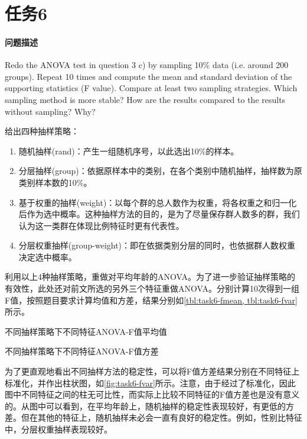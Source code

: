 \documentclass[a4paper,12pt]{article}
\begin{document}
    \section{任务6} %
    \paragraph{问题描述} Redo the ANOVA test in question 3 c) by sampling 10\% data (i.e. around 200 groups). Repeat 10 times and compute the mean and standard deviation of the supporting statistics (F value). Compare at least two sampling strategies. Which sampling method is more stable? How are the results compared to the results without sampling? Why?

    给出四种抽样策略：
    \begin{enumerate}
      \item 随机抽样(rand)：产生一组随机序号，以此选出10\%的样本。
      \item 分层抽样(group)：依据原样本中的类别，在各个类别中随机抽样，抽样数为原类别样本数的10\%。
      \item 基于权重的抽样(weight)：以每个群的总人数作为权重，将各权重之和归一化后作为选中概率。这种抽样方法的目的，是为了尽量保存群人数多的群，我们认为这一类群在体现比例特征时更有代表性。
      \item 分层权重抽样(group-weight)：即在依据类别分层的同时，也依据群人数权重决定选中概率。
    \end{enumerate}

    利用以上4种抽样策略，重做对平均年龄的ANOVA。为了进一步验证抽样策略的有效性，此处还对前文所选的另外三个特征重做ANOVA。分别计算10次得到一组F值，按照题目要求计算均值和方差，结果分别如\cref{tbl:task6-fmean, tbl:task6-fvar}所示。

    \begin{table}[htbp]
      \centering
      \caption{不同抽样策略下不同特征ANOVA-F值平均值}
      \label{tbl:task6-fmean}
      
    \end{table}
    \begin{table}[htbp]
      \centering
      \caption{不同抽样策略下不同特征ANOVA-F值方差}
      \label{tbl:task6-fvar}
      
    \end{table}

    为了更直观地看出不同抽样方法的稳定性，可以将F值方差结果分别在不同特征上标准化，并作出柱状图，如\cref{fig:task6-fvar}所示。注意，由于经过了标准化，因此图中不同特征之间的柱无可比性，而实际上比较不同特征的F值方差也是没有意义的。从图中可以看到，在平均年龄上，随机抽样的稳定性表现较好，有更低的方差。但在其他的特征上，随机抽样未必会一直有良好的稳定性。例如，性别比特征中，分层权重抽样表现较好。
\end{document}
